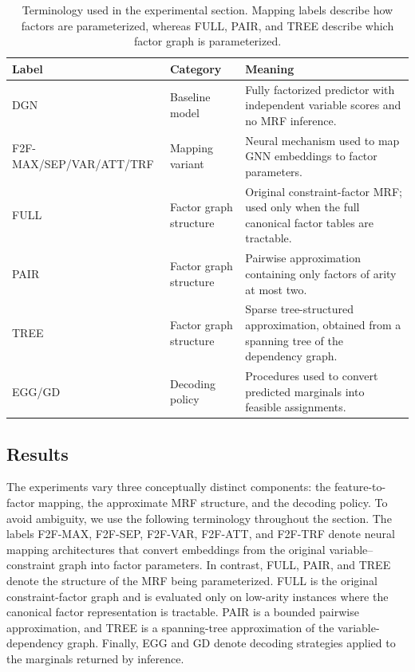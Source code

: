 \begin{table}[H]
\centering
\small
\begin{tabular}{p{2.2cm} p{3.1cm} p{7.2cm}}
\toprule
\textbf{Label} & \textbf{Category} & \textbf{Meaning} \\
\midrule
DGN & Baseline model & Fully factorized predictor with independent variable scores and no MRF inference. \\
F2F-MAX/SEP/VAR/ATT/TRF & Mapping variant & Neural mechanism used to map GNN embeddings to factor parameters. \\
FULL & Factor graph structure & Original constraint-factor MRF; used only when the full canonical factor tables are tractable. \\
PAIR & Factor graph structure & Pairwise approximation containing only factors of arity at most two. \\
TREE & Factor graph structure & Sparse tree-structured approximation, obtained from a spanning tree of the dependency graph. \\
EGG/GD & Decoding policy & Procedures used to convert predicted marginals into feasible assignments. \\
\bottomrule
\end{tabular}
\caption{Terminology used in the experimental section. Mapping labels describe how factors are parameterized, whereas FULL, PAIR, and TREE describe which factor graph is parameterized.}
\label{tab:chapter_5_experimental_terminology}
\end{table}

\subsection{Results}
\label{subsec:chapter_5_results}

The experiments vary three conceptually distinct components: the feature-to-factor mapping, the approximate MRF structure, and the decoding policy. To avoid ambiguity, we use the following terminology throughout the section. The labels F2F-MAX, F2F-SEP, F2F-VAR, F2F-ATT, and F2F-TRF denote neural mapping architectures that convert embeddings from the original variable--constraint graph into factor parameters. In contrast, FULL, PAIR, and TREE denote the structure of the MRF being parameterized. FULL is the original constraint-factor graph and is evaluated only on low-arity instances where the canonical factor representation is tractable. PAIR is a bounded pairwise approximation, and TREE is a spanning-tree approximation of the variable-dependency graph. Finally, EGG and GD denote decoding strategies applied to the marginals returned by inference.

